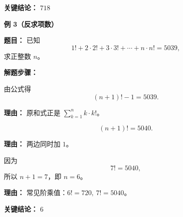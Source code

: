 \begin{examplebox}
\textbf{\textcolor{CExample}{关键结论：}} \textbf{$\boxed{718}$}

\medskip
\textbf{\textcolor{CExample}{例 3（反求项数）}}

\textbf{\textcolor{CExample}{题目：}} 已知
\[
1!+2\cdot2!+3\cdot3!+\cdots+n\cdot n!=5039,
\]
求正整数 $n$。

\textbf{\textcolor{CExample}{解题步骤：}}
\begin{description}[style=nextline, leftmargin=2.8em, labelsep=0.5em, itemsep=0.45em]
    \item[\textbf{第一步（建立方程）：}] 由公式得
    \[
    (n+1)!-1=5039.
    \]
    \par\textbf{理由：} 原和式正是 $\sum_{k=1}^{n}k\cdot k!$。

    \item[\textbf{第二步（移项）：}] 
    \[
    (n+1)!=5040.
    \]
    \par\textbf{理由：} 两边同时加 $1$。

    \item[\textbf{第三步（匹配阶乘）：}] 因为
    \[
    7!=5040,
    \]
    所以 $n+1=7$，即 $n=6$。
    \par\textbf{理由：} 常见阶乘值：$6!=720,\ 7!=5040$。
\end{description}

\textbf{\textcolor{CExample}{关键结论：}} \textbf{$\boxed{6}$}
\end{examplebox}
